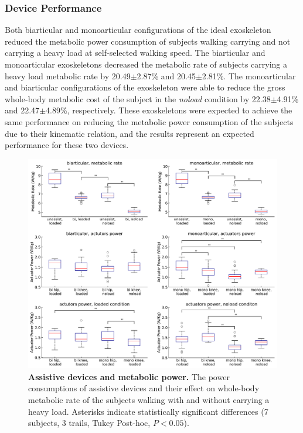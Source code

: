 \documentclass[10pt,letterpaper]{article}
\begin{document}
\subsubsection*{Device Performance}
Both biarticular and monoarticular configurations of the ideal exoskeleton reduced the metabolic power consumption of subjects walking carrying and not carrying a heavy load at self-selected walking speed. The biarticular and monoarticular exoskeletons decreased the metabolic rate of subjects carrying a heavy load metabolic rate by 20.49$\pm$2.87\% and 20.45$\pm$2.81\%. The monoarticular and biarticular configurations of the exoskeleton were able to reduce the gross whole-body metabolic cost of the subject in the \textit{noload} condition by 22.38$\pm$4.91\% and 22.47$\pm$4.89\%, respectively. These exoskeletons were expected to achieve the same performance on reducing the metabolic power consumption of the subjects due to their kinematic relation, and the results represent an expected performance for these two devices.\\
\begin{figure}[ht]   
	\centering
	\includegraphics[width=\linewidth]{Ideal_Exo_MonovsBi_Figures/Paper_Figure_Energy_BoxPlot.pdf}
	\vspace{1mm}
	\caption{\small{\textbf{Assistive devices and metabolic power.} The power consumptions of assistive devices and their effect on whole-body metabolic rate of the subjects walking with and without carrying a heavy load. Asterisks indicate statistically significant differences (7 subjects, 3 trails, Tukey Post-hoc, $P < 0.05$).}}
	\label{Fig_IdealExo_Energy_BoxPlot}
\end{figure}
\end{document}
